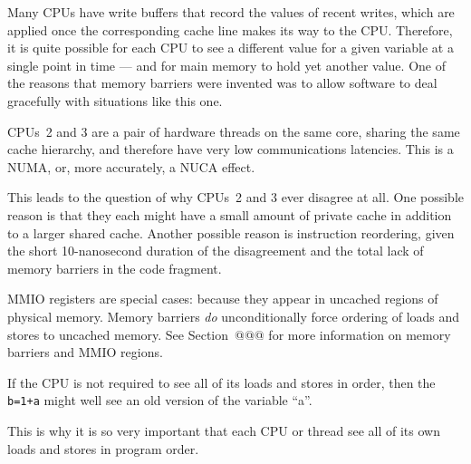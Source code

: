 
	   Many CPUs have write buffers that record the values of
	   recent writes, which are applied once the corresponding
	   cache line makes its way to the CPU.
	   Therefore, it is quite possible for each CPU to see a
	   different value for a given variable at a single point
	   in time --- and for main memory to hold yet another value.
	   One of the reasons that memory barriers were invented was
	   to allow software to deal gracefully with situations like
	   this one.


	   CPUs~2 and 3 are a pair of hardware threads on the same
	   core, sharing the same cache hierarchy, and therefore have
	   very low communications latencies.
	   This is a NUMA, or, more accurately, a NUCA effect.

	   This leads to the question of why CPUs~2 and 3 ever disagree
	   at all.
	   One possible reason is that they each might have a small amount
	   of private cache in addition to a larger shared cache.
	   Another possible reason is instruction reordering, given the
	   short 10-nanosecond duration of the disagreement and the
	   total lack of memory barriers in the code fragment.


	MMIO registers are special cases: because they appear
	in uncached regions of physical memory.
	Memory barriers \emph{do} unconditionally force ordering
	of loads and stores to uncached memory.
	See Section~@@@ for more information on memory barriers
	and MMIO regions.


	If the CPU is not required to see all of its loads and
	stores in order, then the {\tt b=1+a} might well see an
	old version of the variable ``a''.
	
	This is why it is so very important that each CPU or thread
	see all of its own loads and stores in program order.


